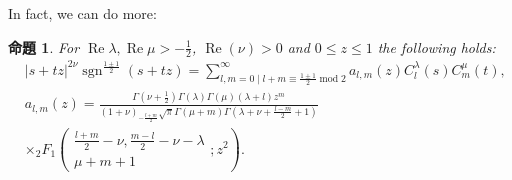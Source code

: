 \documentclass[pdf,notes]{beamer}
\newcommand{\tmop}[1]{\ensuremath{\operatorname{#1}}}
\newtheorem{prop}{命題}
\begin{document}
\begin{frame}
	In fact, we can do more:
	\begin{prop}\label{prop:exp-stz-gg}
		  \label{thm:4}For $\tmop{Re} \lambda, \tmop{Re} \mu > - \frac{1}{2}$,
		    $\tmop{Re} (\nu) > 0$ and $0 \leqslant z \leqslant 1$ the following holds:
		      \begin{eqnarray}
			          & | s + t z |^{2 \nu} \tmop{sgn}^{\frac{1 \pm 1}{2}} (s + t z) = \sum_{l,
					      m = 0 \mid l + m \equiv \frac{1 \pm 1}{2} \tmop{mod} 2}^{\infty} a_{l, m}
					          (z) C_l^{\lambda} (s) C_m^{\mu} (t), &  \nonumber\\
						      & a_{l, m} (z) = \frac{\Gamma \left( \nu + \frac{1}{2} \right) \Gamma
						      (\lambda) \Gamma (\mu) (\lambda + l) z^m }{(1 + \nu)_{- \frac{l + m}{2}} \sqrt{\pi} \Gamma
										      (\mu + m) \Gamma \left( \lambda + \nu + \frac{l - m}{2} + 1 \right)}&\nonumber
										      \\&\times{}_2 F_1 \left( \begin{array}{c}
								        \frac{l + m}{2} - \nu, \frac{m - l}{2} - \nu - \lambda\\
									      \mu + m + 1
									          \end{array} ; z^2 \right). & 
										          \nonumber
											    \end{eqnarray}
										    \end{prop}
\end{frame}
\end{document}
